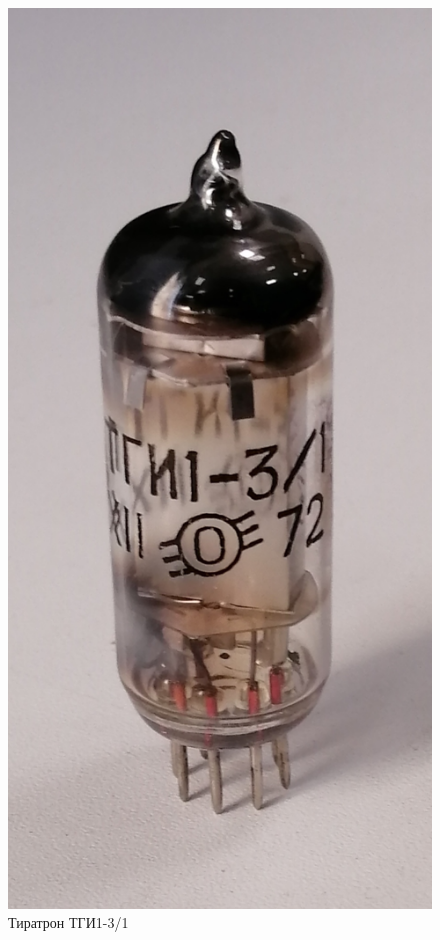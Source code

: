 \documentclass{beamer}
\begin{document}
\begin{frame}
\begin{columns}
\begin{figure}
				\includegraphics[width=\linewidth]{res/tirat_ar.png}
				\caption*{Тиратрон ТГИ1-3/1}
			\end{figure}
		\end{columns}
	\end{frame}	
\end{document}
